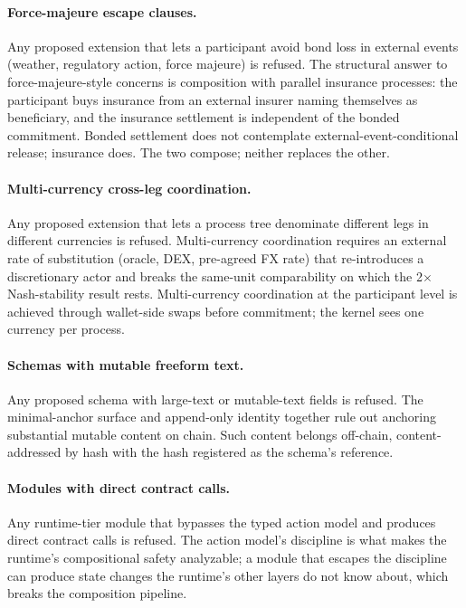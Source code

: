 \documentclass[11pt,a4paper]{article}
\theoremstyle{definition}
\theoremstyle{remark}
\begin{document}
\paragraph{Force-majeure escape clauses.}
Any proposed extension that lets a participant avoid bond loss in
external events (weather, regulatory action, force majeure) is
refused. The structural answer to force-majeure-style concerns is
composition with parallel insurance processes: the participant
buys insurance from an external insurer naming themselves as
beneficiary, and the insurance settlement is independent of the
bonded commitment. Bonded settlement does not contemplate
external-event-conditional release; insurance does. The two compose;
neither replaces the other.

\paragraph{Multi-currency cross-leg coordination.}
Any proposed extension that lets a process tree denominate
different legs in different currencies is refused. Multi-currency
coordination requires an external rate of substitution (oracle,
DEX, pre-agreed FX rate) that re-introduces a discretionary actor
and breaks the same-unit comparability on which the 2$\times$
Nash-stability result rests. Multi-currency coordination at the
participant level is achieved through wallet-side swaps before
commitment; the kernel sees one currency per process.

\paragraph{Schemas with mutable freeform text.}
Any proposed schema with large-text or mutable-text fields is
refused. The minimal-anchor surface and append-only identity
together rule out anchoring substantial mutable content on chain.
Such content belongs off-chain, content-addressed by hash with the
hash registered as the schema's reference.

\paragraph{Modules with direct contract calls.}
Any runtime-tier module that bypasses the typed action model and
produces direct contract calls is refused. The action model's
discipline is what makes the runtime's compositional safety
analyzable; a module that escapes the discipline can produce
state changes the runtime's other layers do not know about, which
breaks the composition pipeline.
\end{document}
